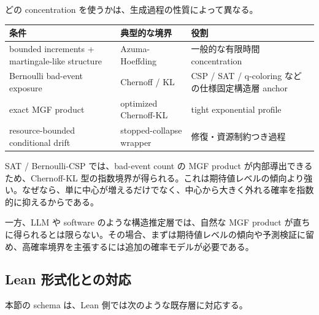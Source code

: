 \documentclass[12pt,a4paper]{article}
\begin{document}
どの concentration を使うかは、生成過程の性質によって異なる。

{\def\LTcaptype{table} %
\begin{longtable}[]{@{}
  >{\raggedright\arraybackslash}p{}
  >{\raggedright\arraybackslash}p{}
  >{\raggedright\arraybackslash}p{}@{}}
\toprule\noalign{}
\begin{minipage}[b]{\linewidth}\raggedright
条件
\end{minipage} & \begin{minipage}[b]{\linewidth}\raggedright
典型的な境界
\end{minipage} & \begin{minipage}[b]{\linewidth}\raggedright
役割
\end{minipage} \\
\midrule\noalign{}
\endhead
\bottomrule\noalign{}
\endlastfoot
bounded increments + martingale-like structure & Azuma-Hoeffding & 一般的な有限時間 concentration \\
Bernoulli bad-event exposure & Chernoff / KL & CSP / SAT / q-coloring などの仕様固定構造層 anchor \\
exact MGF product & optimized Chernoff-KL & tight exponential profile \\
resource-bounded conditional drift & stopped-collapse wrapper & 修復・資源制約つき過程 \\
\end{longtable}
}

SAT / Bernoulli-CSP では、bad-event count の MGF product が内部導出できるため、Chernoff-KL 型の指数境界が得られる。これは期待値レベルの傾向より強い。なぜなら、単に中心が増えるだけでなく、中心から大きく外れる確率を指数的に抑えるからである。

一方、LLM や software のような構造推定層では、自然な MGF product が直ちに得られるとは限らない。その場合、まずは期待値レベルの傾向や予測検証に留め、高確率境界を主張するには追加の確率モデルが必要である。

\subsection{Lean 形式化との対応}\label{lean-ux5f62ux5f0fux5316ux3068ux306eux5bfeux5fdc-1}

本節の schema は、Lean 側では次のような既存層に対応する。
\end{document}
